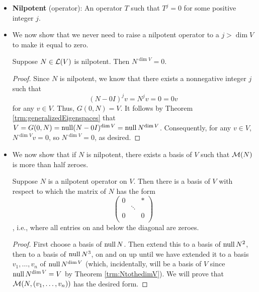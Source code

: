\documentclass[../main.tex]{subfiles}
\begin{document}
\begin{itemize}
\begin{theorem}
\begin{proof}
\begin{align*}
                &= a_j\prod_{\substack{i=1\\i\neq j}}^m(\lambda_j-\lambda_i)^nw
            \end{align*}
            so $a_j=0$, as desired.
        \end{proof}
    \end{theorem}
    \item \textbf{Nilpotent} (operator): An operator $T$ such that $T^j=0$ for some positive integer $j$.
    \item We now show that we never need to raise a nilpotent operator to a $j>\dim V$ to make it equal to zero.
    \begin{theorem}\label{trm:NtothedimV}
        Suppose $N\in\mathcal{L}(V)$ is nilpotent. Then $N^{\dim V}=0$.
        \begin{proof}
            Since $N$ is nilpotent, we know that there exists a nonnegative integer $j$ such that
            \begin{equation*}
                (N-0I)^jv = N^jv = 0 = 0v
            \end{equation*}
            for any $v\in V$. Thus, $G(0,N)=V$. It follows by Theorem \ref{trm:generalizedEigenspaces} that $V=G(0,N)=\operatorname{null}(N-0I)^{\dim V}=\operatorname{null} N^{\dim V}$. Consequently, for any $v\in V$, $N^{\dim V}v=0$, so $N^{\dim V}=0$, as desired.
        \end{proof}
    \end{theorem}
    \item We now show that if $N$ is nilpotent, there exists a basis of $V$ such that $\mathcal{M}(N)$ is more than half zeroes.
    \begin{theorem}
        Suppose $N$ is a nilpotent operator on $V$. Then there is a basis of $V$ with respect to which the matrix of $N$ has the form
        \begin{equation*}
            \begin{pmatrix}
                0 &  & *\\
                 & \ddots & \\
                0 &  & 0\\
            \end{pmatrix}
        \end{equation*}
        , i.e., where all entries on and below the diagonal are zeroes.
        \begin{proof}
            First choose a basis of $\operatorname{null} N$. Then extend this to a basis of $\operatorname{null} N^2$, then to a basis of $\operatorname{null} N^3$, on and on up until we have extended it to a basis $v_1,\dots,v_n$ of $\operatorname{null} N^{\dim V}$ (which, incidentally, will be a basis of $V$ since $\operatorname{null} N^{\dim V}=V$ by Theorem \ref{trm:NtothedimV}). We will prove that $\mathcal{M}(N,(v_1,\dots,v_n))$ has the desired form.\par

\end{proof}
\end{theorem}
\end{itemize}
\end{document}
